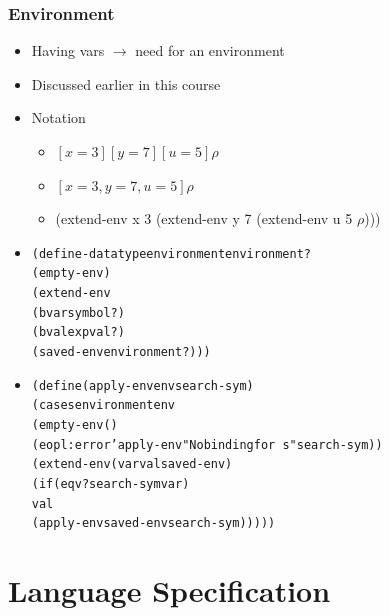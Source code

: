 \documentclass{beamer}
\newcommand{\arrow}{\(\rightarrow\)}
\newcommand{\quot}{\texttt{\textquotesingle{}}}
\begin{document}
\begin{frame}[fragile]
\frametitle{Environment}
\begin{scriptsize}
\begin{itemize}
\item<1-> Having vars \arrow{} need for an environment

\item<1-> Discussed earlier in this course

\item<2-> Notation
 \begin{itemize}
	\item $[x=3] [y=7] [u=5] \rho$
	\item $[x=3, y=7, u=5] \rho$
	\item (extend-env \quot{}x 3 (extend-env \quot{}y 7 (extend-env \quot{}u 5 $\rho$)))
 \end{itemize}

\item<3->
\begin{alltt}
(define-datatype environment environment?
  (empty-env)
  (extend-env
   (bvar symbol?)
   (bval expval?)
   (saved-env environment?)))
\end{alltt}

\item<4->
\begin{alltt}
(define (apply-env env search-sym)
  (cases environment env
    (empty-env ()
         (eopl:error 'apply-env "No binding for ~s" search-sym))
    (extend-env (var val saved-env)
         (if (eqv? search-sym var)
             val
             (apply-env saved-env search-sym)))))
\end{alltt}

\end{itemize}
\end{scriptsize}
\end{frame}



\section{Language Specification}
\end{document}
